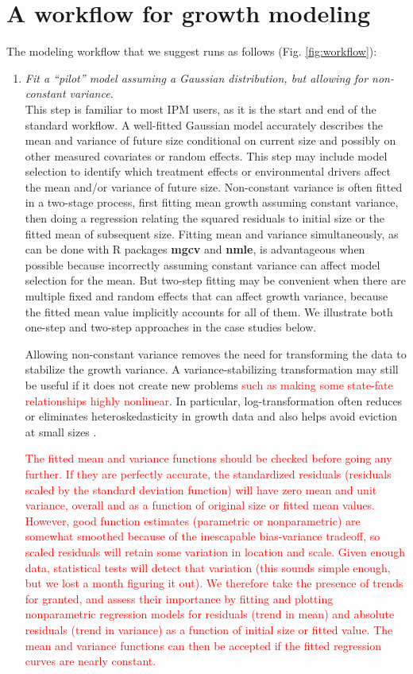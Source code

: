 \documentclass[12pt]{article}
\newcommand{\new}{\textcolor{red}}
\begin{document}
\section{A workflow for growth modeling}
The modeling workflow that we suggest runs as follows (Fig. \ref{fig:workflow}):
\begin{enumerate}[label=\arabic*., listparindent=1.5em]
\item \textit{Fit a ``pilot'' model assuming a Gaussian distribution, but allowing for non-constant variance.}
\\ 
This step is familiar to most IPM users, as it is the start and end of the standard workflow. 
A well-fitted Gaussian model accurately describes the mean and variance of future size conditional on current size and possibly on other measured covariates or random effects. 
This step may include model selection to identify which treatment effects or environmental drivers affect the mean and/or variance of future size. 
Non-constant variance is often fitted in a two-stage process, first fitting mean growth assuming constant variance, then doing a regression relating the squared residuals to initial size or the fitted mean of subsequent size. 
Fitting mean and variance simultaneously, as can be done with R packages \textbf{mgcv} and \textbf{nmle}, is advantageous when possible because incorrectly assuming constant variance can affect model selection for the mean. 
But two-step fitting may be convenient when there are multiple fixed and random effects that can affect growth variance, because the fitted mean value implicitly accounts for all of them. 
We illustrate both one-step and two-step approaches in the case studies below. 

Allowing non-constant variance removes the need for transforming the data to stabilize the growth variance. 
A variance-stabilizing transformation may still be useful if it does not create new problems \new{such as making some state-fate
relationships highly nonlinear}. %
In particular, log-transformation often reduces or eliminates heteroskedasticity in growth data \citep{ellner-etal-2016} 
and also helps avoid eviction at small sizes \citep{williams2012avoiding}. 

\new{The fitted mean and variance functions should be checked before going any further. 
If they are perfectly accurate, the standardized residuals (residuals scaled by the standard deviation function) 
will have zero mean and unit variance, overall and as a function of original size or fitted mean values. 
However, good function estimates (parametric or nonparametric) are somewhat smoothed because of the inescapable bias-variance tradeoff,  
so scaled residuals will retain some variation in location and scale. Given enough data, statistical tests
will detect that variation (this sounds simple enough, but we lost a month figuring it out). 
We therefore take the presence of trends for granted, 
and assess their importance by fitting and plotting nonparametric regression models for 
residuals (trend in mean) and absolute residuals (trend in variance) as a function of initial size or 
fitted value. The mean and variance functions can then be accepted if the fitted regression curves are nearly constant.} 


\end{enumerate}
\end{document}
